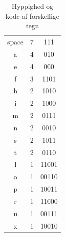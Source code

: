 \begin{table}
\begin{center}
\begin{tabular}{|c|c|c|}
\hline
 \cellcolor{ForestGreen}\color{white}{\textbf{Tegn}} &  \cellcolor{ForestGreen}\color{white}{\textbf{Hyppighed}} & \cellcolor{ForestGreen}\color{white}{\textbf{Binær kode}} \\
\hline
space & 7 & 111 \\ 
\hline 
a & 4 & 010 \\ 
\hline 
e & 4 & 000 \\ 
\hline 
f & 3 & 1101 \\ 
\hline 
h & 2 & 1010 \\ 
\hline 
i & 2 & 1000 \\ 
\hline 
m & 2 & 0111 \\ 
\hline 
n & 2 & 0010 \\ 
\hline 
s & 2 & 1011 \\ 
\hline 
t & 2 & 0110 \\ 
\hline 
l & 1 & 11001 \\ 
\hline 
o & 1 & 00110 \\ 
\hline 
p & 1 & 10011 \\ 
\hline 
r & 1 & 11000 \\ 
\hline 
u & 1 & 00111 \\ 
\hline 
x & 1 & 10010 \\ 
\hline 
\end{tabular}
\caption{Hyppighed og kode af forskellige tegn}
\label{tab:huffmantable}
 \end{center}
\end{table}